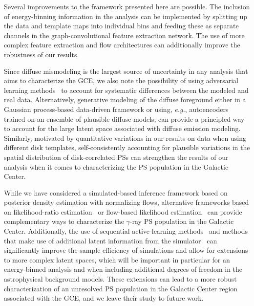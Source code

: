\documentclass[prd,aps,10pt,nofootinbib,twocolumn,superscriptaddress,preprintnumbers,balancelastpage,longbibliography]{revtex4-1}
\begin{document}
Several improvements to the framework presented here are possible. The inclusion of energy-binning information in the analysis can be implemented by splitting up the data and template maps into individual bins and feeding these as separate channels in the graph-convolutional feature extraction network. The use of more complex feature extraction and flow architectures can additionally improve the robustness of our results. 

Since diffuse mismodeling is the largest source of uncertainty in any analysis that aims to characterize the GCE, we also note the possibility of using adversarial learning methods~\cite{Louppe:2016ylz} to account for systematic differences between the modeled and real \Fermi data. Alternatively, generative modeling of the diffuse foreground either in a Gaussian process-based data-driven framework or using, \emph{e.g.}, autoencoders trained on an ensemble of plausible diffuse models, can provide a principled way to account for the large latent space associated with diffuse emission modeling. Similarly, motivated by quantitative variations in our results on \Fermi data when using different disk templates, self-consistently accounting for plausible variations in the spatial distribution of disk-correlated PSs can strengthen the results of our analysis when it comes to characterizing the PS population in the Galactic Center. 

While we have considered a simulated-based inference framework based on posterior density estimation with normalizing flows, alternative frameworks based on likelihood-ratio estimation~\cite{Brehmer:2018eca,Brehmer:2018hga,Brehmer:2018kdj,Cranmer:2015bka, Hermans:2019ioj,Miller:2020hua,Miller:2021hys} or flow-based likelihood estimation~\cite{winkler2019learning,papamakarios2019sequential} can provide complementary ways to characterize the $\gamma$-ray PS population in the Galactic Center. Additionally, the use of sequential active-learning methods~\cite{papamakarios2019sequential} and methods that make use of additional latent information from the simulator~\cite{Brehmer:2018eca,Brehmer:2018hga,Brehmer:2018kdj,Brehmer:2019xox,Stoye:2018ovl} can significantly improve the sample efficiency of simulations and allow for extensions to more complex latent spaces, which will be important in particular for an energy-binned analysis and when including additional degrees of freedom in the astrophysical background models. 
These extensions can lead to a more robust characterization of an unresolved PS population in the Galactic Center region associated with the GCE, and we leave their study to future work.
\end{document}
